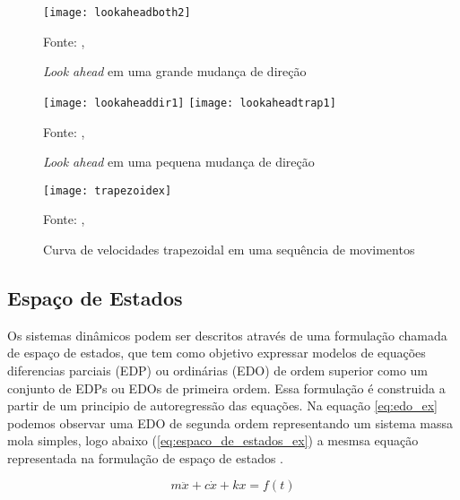 \begin{figure}[!htb]
    \centering
    \caption{\textit{Look ahead} em uma grande mudança de direção}
    \texttt{[image: lookaheadboth2]}

    {\footnotesize Fonte: \citeauthor{klipperkinematic}, \citeyear{klipperkinematic}}
    \label{fig:lookahead_big}
\end{figure}

\begin{figure}[!htb]
    \centering
    \caption{\textit{Look ahead} em uma pequena mudança de direção}
    \texttt{[image: lookaheaddir1]}
    \texttt{[image: lookaheadtrap1]}

    {\footnotesize Fonte: \citeauthor{klipperkinematic}, \citeyear{klipperkinematic}}
    \label{fig:lookahead_small}
\end{figure}


\begin{figure}[!htb]
    \centering
    \caption{Curva de velocidades trapezoidal em uma sequência de movimentos}
    \texttt{[image: trapezoidex]}

    {\footnotesize Fonte: \citeauthor{klipperkinematic}, \citeyear{klipperkinematic}}
    \label{fig:trapezoidal}
\end{figure}


\subsection{Espaço de Estados}

Os sistemas dinâmicos podem ser descritos através de uma formulação
chamada de espaço de estados, que tem como objetivo expressar modelos 
de equações diferencias parciais (EDP) ou ordinárias (EDO) de ordem superior
como um conjunto de EDPs ou EDOs de primeira ordem.
Essa formulação é construida a partir de um principio de autoregressão
das equações. Na equação \ref{eq:edo_ex} podemos observar uma EDO de segunda ordem representando
um sistema massa mola simples,
logo abaixo (\ref{eq:espaco_de_estados_ex}) a mesmsa equação representada na formulação
de espaço de estados \cite{hamilton94}.

\begin{equation}
    \label{eq:edo_ex}
    m \ddot x+c \dot x+kx = f(t)
\end{equation}

